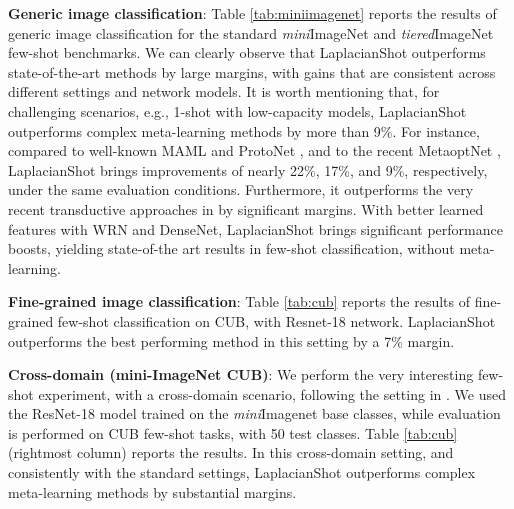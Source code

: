 \documentclass{article}
\begin{document}
\textbf{Generic image classification}: Table \ref{tab:miniimagenet} reports the results of generic image classification for the standard \textit{mini}ImageNet and \textit{tiered}ImageNet few-shot benchmarks. We can clearly observe that LaplacianShot outperforms state-of-the-art methods by large margins, with gains that are consistent across different settings and network models. It is worth mentioning that, for challenging scenarios, e.g., 1-shot with low-capacity models, LaplacianShot outperforms complex meta-learning methods by more than 9\%. For instance, compared to well-known MAML \cite{Finn2017ModelAgnosticMF} and ProtoNet \cite{snell2017prototypical}, and to the recent MetaoptNet \cite{lee2019meta}, LaplacianShot brings improvements of nearly 22\%, 17\%, and 9\%, respectively, under the same evaluation conditions. Furthermore, it outperforms the very recent transductive approaches in \cite{Dhillon2020A,liu2019prototype,liu2018learning} by significant margins. 
With better learned features with WRN and DenseNet, LaplacianShot brings significant performance boosts, yielding state-of-the art results in few-shot classification, without meta-learning. 

\textbf{Fine-grained image classification}:  Table \ref{tab:cub} reports the results of fine-grained few-shot classification on CUB, with Resnet-18 network. LaplacianShot outperforms the best performing method in this setting by a 7\% margin.

\textbf{Cross-domain (mini-ImageNet  CUB)}: We perform the very interesting few-shot experiment, with a cross-domain scenario, following the setting in \cite{chen2018a}. We used the ResNet-18 model trained on the \textit{mini}Imagenet base classes, while evaluation is performed on CUB few-shot tasks, with 50 test classes. Table \ref{tab:cub} (rightmost column) reports the results. In this cross-domain setting, and consistently with the standard settings, LaplacianShot  outperforms complex meta-learning methods by substantial margins. 
\end{document}
